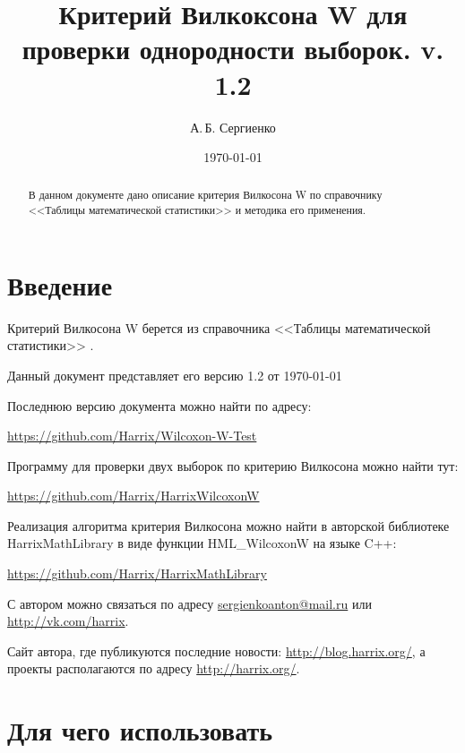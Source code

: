 \documentclass[a4paper,12pt]{article}
\title{Критерий Вилкоксона W для проверки однородности выборок. v. 1.2}
\author{А.\,Б. Сергиенко}
\date{\today}
\begin{document}


\maketitle

\begin{abstract}
В данном документе дано описание критерия Вилкосона W по справочнику <<Таблицы математической статистики>> \cite[с. 93]{book:Bolshev1983} и методика его применения.
\end{abstract}

\tableofcontents

\newpage

\section{Введение}

Критерий Вилкосона W берется из справочника <<Таблицы математической статистики>> \cite[с. 93]{book:Bolshev1983}.

Данный документ представляет его версию 1.2 от \today

Последнюю версию документа можно найти по адресу:

\href{https://github.com/Harrix/Wilcoxon-W-Test}{https://github.com/Harrix/Wilcoxon-W-Test}

Программу для проверки двух выборок по критерию Вилкосона можно найти тут:

\href{https://github.com/Harrix/HarrixWilcoxonW}{https://github.com/Harrix/HarrixWilcoxonW}

Реализация алгоритма критерия Вилкосона можно найти в авторской библиотеке HarrixMathLibrary в виде функции HML\_WilcoxonW на языке C++:

\href{https://github.com/Harrix/HarrixMathLibrary}{https://github.com/Harrix/HarrixMathLibrary}

С автором можно связаться по адресу \href{mailto:sergienkoanton@mail.ru}{sergienkoanton@mail.ru} или  \href{http://vk.com/harrix}{http://vk.com/harrix}.

Сайт автора, где публикуются последние новости: \href{http://blog.harrix.org/}{http://blog.harrix.org/}, а проекты располагаются по адресу \href{http://harrix.org/}{http://harrix.org/}.

\section{Для чего использовать}
\end{document}

